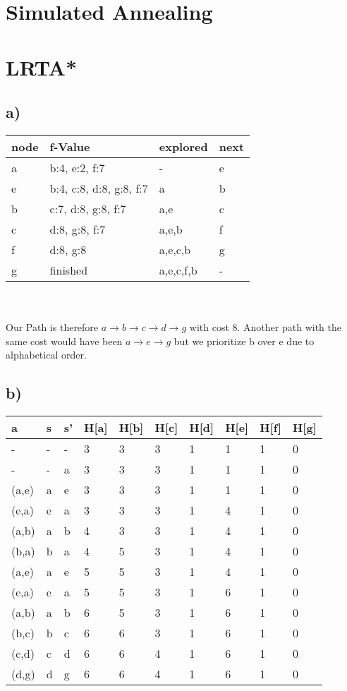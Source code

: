 \documentclass[12pt,a4paper]{scrartcl}
\begin{document}
	
\section{Simulated Annealing}

\section{LRTA*}
\subsection*{a)}
	\begin{tabular}{|l | l | l | l |}
		node & f-Value & explored & next \\ \hline
		a & b:4, e:2, f:7 & - & e \\
		e & b:4, c:8, d:8, g:8, f:7 & a & b \\
		b & c:7, d:8, g:8, f:7 & a,e & c \\
		c & d:8, g:8, f:7 & a,e,b & f \\
		f & d:8, g:8 & a,e,c,b & g \\
		g & finished & a,e,c,f,b & - 
	\end{tabular}\\\\
	Our Path is therefore $a \rightarrow b \rightarrow c \rightarrow d \rightarrow g$ with cost 8. Another path with the same cost would have been $a \rightarrow e \rightarrow g$ but we prioritize b over e due to alphabetical order.
\subsection*{b)}
	\begin{tabular}{l | l | l || l | l | l | l | l | l | l}
		a & s & s' & H[a] & H[b] & H[c] & H[d] & H[e] & H[f] & H[g] \\ \hline
		- & - & - & 3 & 3 & 3 & 1 & 1 & 1 & 0 \\
		- & - & a & 3 & 3 & 3 & 1 & 1 & 1 & 0 \\
		(a,e)  & a & e & 3 & 3 & 3 & 1 & 1 & 1 & 0 \\
		(e,a)  & e & a & 3 & 3 & 3 & 1 & 4 & 1 & 0 \\
		(a,b)  & a & b & 4 & 3 & 3 & 1 & 4 & 1 & 0 \\
		(b,a)  & b & a & 4 & 5 & 3 & 1 & 4 & 1 & 0 \\
		(a,e)  & a & e & 5 & 5 & 3 & 1 & 4 & 1 & 0 \\
		(e,a)  & e & a & 5 & 5 & 3 & 1 & 6 & 1 & 0 \\
		(a,b)  & a & b & 6 & 5 & 3 & 1 & 6 & 1 & 0 \\
		(b,c)  & b & c & 6 & 6 & 3 & 1 & 6 & 1 & 0 \\
		(c,d)  & c & d & 6 & 6 & 4 & 1 & 6 & 1 & 0 \\
		(d,g)  & d & g & 6 & 6 & 4 & 1 & 6 & 1 & 0 \\
	\end{tabular} \\
\end{document}
